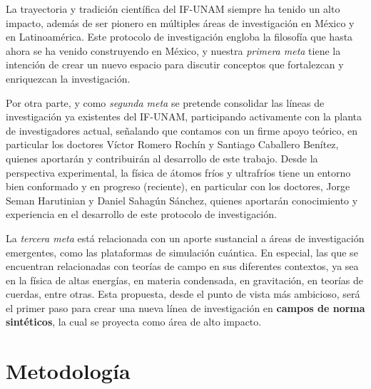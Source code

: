 \documentclass[superscriptaddress,onecolumn,aps,preprint,showpacs,nofootinbib,pra,11pt]{revtex4-2}
\begin{document}
\begin{normalsize}
La trayectoria y tradición científica del IF-UNAM siempre ha tenido un alto impacto, además de ser pionero en múltiples áreas de investigación en México y en Latinoamérica. Este protocolo de investigación engloba la filosofía que hasta ahora se ha venido construyendo en México, y nuestra \textit{primera meta} tiene la intención de crear un nuevo espacio para discutir conceptos que fortalezcan y enriquezcan la investigación. \medskip

Por otra parte, y como \textit{segunda meta} se pretende consolidar las líneas de investigación ya existentes del IF-UNAM, participando activamente con la planta de investigadores actual, señalando que contamos con un firme apoyo teórico, en particular los doctores Víctor Romero Rochín y Santiago Caballero Benítez, quienes aportarán y contribuirán al desarrollo de este trabajo. Desde la perspectiva experimental, la física de átomos fríos y ultrafríos tiene un entorno bien conformado y en progreso (reciente), en particular con los doctores, Jorge Seman Harutinian y Daniel Sahagún Sánchez, quienes aportarán conocimiento y experiencia en el desarrollo de este protocolo de investigación.\medskip

La \textit{tercera meta} está relacionada con un aporte sustancial a áreas de investigación emergentes, como las plataformas de simulación cuántica. En especial, las que se encuentran relacionadas con teorías de campo en sus diferentes contextos, ya sea en la física de altas energías, en materia condensada, en gravitación, en teorías de cuerdas, entre otras. Esta propuesta, desde el punto de vista más ambicioso, será el primer paso para crear una nueva línea de investigación en \textbf{campos de norma sintéticos}, la cual se proyecta como área de alto impacto.

\section{Metodología}


\end{normalsize}
\end{document}
